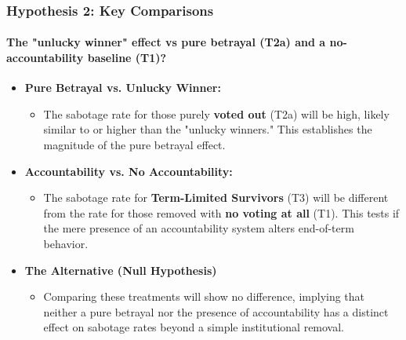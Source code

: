 \documentclass[10pt]{beamer}
\begin{document}
\begin{frame}
  \frametitle{Hypothesis 2: Key Comparisons}
  \framesubtitle{The "unlucky winner" effect vs pure betrayal (T2a) and a no-accountability baseline (T1)?}

  \setlength{\leftmargini}{0pt}
  \begin{itemize}
    \item[] \textbf{Pure Betrayal vs. Unlucky Winner:}\\
    \begin{itemize}
      \item The sabotage rate for those purely \textbf{voted out} (T2a) will be high, likely similar to or higher than the "unlucky winners." This establishes the magnitude of the pure betrayal effect. \\
    \end{itemize}
    \item[] \textbf{Accountability vs. No Accountability:}\\
    \begin{itemize}
      \item The sabotage rate for \textbf{Term-Limited Survivors} (T3) will be different from the rate for those removed with \textbf{no voting at all} (T1). This tests if the mere presence of an accountability system alters end-of-term behavior.
    \end{itemize}
    \item[] \textbf{The Alternative (Null Hypothesis)}
    \begin{itemize}
      \item Comparing these treatments will show no difference, implying that neither a pure betrayal nor the presence of accountability has a distinct effect on sabotage rates beyond a simple institutional removal.
    \end{itemize}
  \end{itemize}
  \hspace{2em}
\end{frame}
\end{document}
